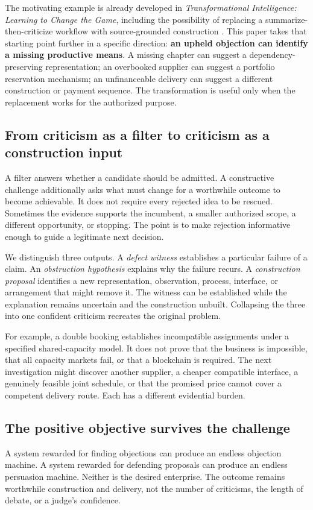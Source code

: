 \documentclass[11pt,a4paper]{article}
\newcommand{\term}[1]{\textbf{#1}}
\begin{document}
The motivating example is already developed in \emph{Transformational Intelligence: Learning to Change the Game}, including the possibility of replacing a summarize-then-criticize workflow with source-grounded construction \cite[Sec.~1; App.~C]{ti}. This paper takes that starting point further in a specific direction: \term{an upheld objection can identify a missing productive means}. A missing chapter can suggest a dependency-preserving representation; an overbooked supplier can suggest a portfolio reservation mechanism; an unfinanceable delivery can suggest a different construction or payment sequence. The transformation is useful only when the replacement works for the authorized purpose.

\subsection{From criticism as a filter to criticism as a construction input}
A filter answers whether a candidate should be admitted. A constructive challenge additionally asks what must change for a worthwhile outcome to become achievable. It does not require every rejected idea to be rescued. Sometimes the evidence supports the incumbent, a smaller authorized scope, a different opportunity, or stopping. The point is to make rejection informative enough to guide a legitimate next decision.

We distinguish three outputs. A \emph{defect witness} establishes a particular failure of a claim. An \emph{obstruction hypothesis} explains why the failure recurs. A \emph{construction proposal} identifies a new representation, observation, process, interface, or arrangement that might remove it. The witness can be established while the explanation remains uncertain and the construction unbuilt. Collapsing the three into one confident criticism recreates the original problem.

For example, a double booking establishes incompatible assignments under a specified shared-capacity model. It does not prove that the business is impossible, that all capacity markets fail, or that a blockchain is required. The next investigation might discover another supplier, a cheaper compatible interface, a genuinely feasible joint schedule, or that the promised price cannot cover a competent delivery route. Each has a different evidential burden.

\subsection{The positive objective survives the challenge}
A system rewarded for finding objections can produce an endless objection machine. A system rewarded for defending proposals can produce an endless persuasion machine. Neither is the desired enterprise. The outcome remains worthwhile construction and delivery, not the number of criticisms, the length of debate, or a judge's confidence.
\end{document}
